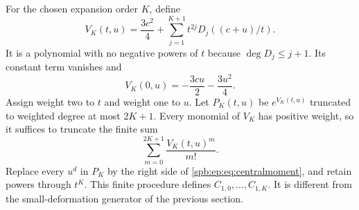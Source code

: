 For the chosen expansion order $K$, define
\begin{equation}\label{spb:ep:eq:VK}
 V_K(t,u)=\frac{3c^2}{4}
            +\sum_{j=1}^{K+1}t^{2j}D_j((c+u)/t).
\end{equation}
It is a polynomial with no negative powers of $t$ because
$\deg D_j\le j+1$. Its constant term vanishes and
\begin{equation}\label{spb:ep:eq:VK0}
 V_K(0,u)=-\frac{3cu}{2}-\frac{3u^2}{4}.
\end{equation}
Assign weight two to $t$ and weight one to $u$.
Let $P_K(t,u)$ be $e^{V_K(t,u)}$ truncated to weighted degree at most
$2K+1$. Every monomial of $V_K$ has positive weight, so it suffices to
truncate the finite sum
\begin{equation}\label{spb:ep:eq:PK}
 \sum_{m=0}^{2K+1}\frac{V_K(t,u)^m}{m!}.
\end{equation}
Replace every $u^d$ in $P_K$ by the right side of
\eqref{spb:ep:eq:centralmoment}, and retain powers through $t^K$.
This finite procedure defines $C_{1,0},\ldots,C_{1,K}$.
It is different from the small-deformation generator of the previous section.

